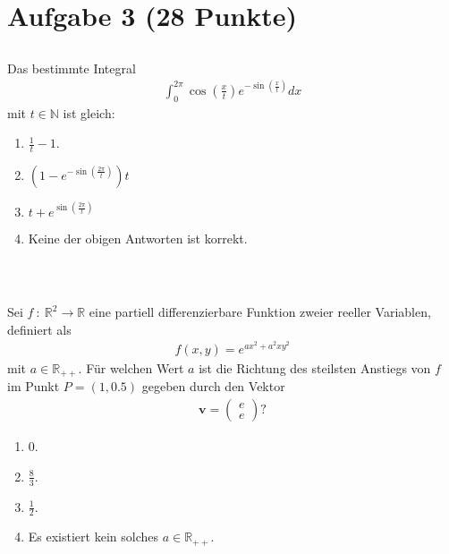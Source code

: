\section*{Aufgabe 3 (28 Punkte)}
\vspace{0.4cm}

\subsection*{}
Das bestimmte Integral
\begin{align*}
	\int_0^{2\pi} \cos \left(\frac{x}{t}\right) e^{- \sin(\frac{x}{t})} dx
\end{align*}
mit $ t \in \mathbb{N} $ ist gleich:

\renewcommand{\labelenumi}{(\alph{enumi})}
\begin{enumerate}
\item 
$ \frac{1}{t} -1  $.
\item
$ (1 - e^{-\sin\left(\frac{2\pi}{t}\right)})t $
\item
$ t + e^{\sin\left(\frac{2\pi}{t}\right)} $
\item 
Keine der obigen Antworten ist korrekt.
\end{enumerate}
\ \\
\subsection*{}
Sei $ f \ : \ \mathbb{R}^2 \to \mathbb{R} $ eine partiell differenzierbare Funktion zweier reeller Variablen, definiert als 
\begin{align*}
	f(x,y) = e^{ax^2 +a^2 xy^2}
\end{align*}
mit $ a \in \mathbb{R}_{++} $. Für welchen Wert $ a $ ist die Richtung des steilsten Anstiegs von $ f $ im Punkt $ P = (1,0.5) $ gegeben durch den Vektor
\begin{align*}
	\textbf{v} =
	\begin{pmatrix}
		e\\
		e
	\end{pmatrix}?
\end{align*}
\renewcommand{\labelenumi}{(\alph{enumi})}
\begin{enumerate}
	\item 
	$0 $.
	\item
	$\frac{8}{3}$.
	\item
	$\frac{1}{2}$.
	\item
	Es existiert kein solches $ a \in \mathbb{R}_{++} $.
\end{enumerate}
\newpage
